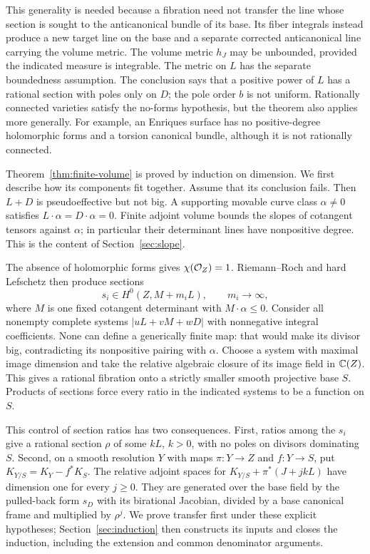 This generality is needed because a fibration need not transfer the
line whose section is sought to the anticanonical bundle of its base.
Its fiber integrals instead produce a new target line on the base and
a separate corrected anticanonical line carrying the volume metric.
The volume metric $h_J$ may be unbounded, provided the indicated
measure is integrable. The metric on $L$ has the separate boundedness
assumption. The conclusion says that a positive power of $L$
has a rational section with poles only on $D$; the pole order $b$ is not
uniform. Rationally connected varieties satisfy the no-forms hypothesis,
but the theorem also applies more generally. For example, an Enriques
surface has no positive-degree holomorphic forms and a torsion canonical
bundle, although it is not rationally connected.

Theorem~\ref{thm:finite-volume} is proved by induction on dimension.
We first describe how its components fit together.
Assume that its conclusion fails. Then $L+D$ is pseudoeffective but not
big. A supporting movable curve class $\alpha\ne0$ satisfies
$L\cdot\alpha=D\cdot\alpha=0$. Finite adjoint volume bounds the slopes
of cotangent tensors against $\alpha$; in particular their determinant
lines have nonpositive degree. This is the content of
Section~\ref{sec:slope}.

The absence of holomorphic forms gives $\chi(\mathcal O_Z)=1$. Riemann--Roch
and hard Lefschetz then produce sections
\[
 s_i\in H^0(Z,M+m_iL),\qquad m_i\longrightarrow\infty,
\]
where $M$ is one fixed cotangent determinant with $M\cdot\alpha\le0$.
Consider all nonempty complete systems $|uL+vM+wD|$ with nonnegative
integral coefficients. None can define a generically finite map: that
would make its divisor big, contradicting its nonpositive pairing with
$\alpha$. Choose a system with maximal image dimension and take the
relative algebraic closure of its image field in $\mathbb C(Z)$. This gives a
rational fibration onto a strictly smaller smooth projective base $S$.
Products of sections force every ratio in the indicated systems to be
a function on $S$.

This control of section ratios has two consequences. First, ratios among the
$s_i$ give a rational section $\rho$ of some $kL$, $k>0$, with no poles
on divisors dominating $S$. Second, on a smooth resolution $Y$ with maps $\pi:Y\to Z$ and
$f:Y\to S$, put $K_{Y/S}=K_Y-f^*K_S$. The relative adjoint spaces for
$K_{Y/S}+\pi^*(J+jkL)$ have dimension one for every $j\ge0$.
They are generated over the base field by the pulled-back form $s_D$
with its birational Jacobian,
divided by a base canonical frame and multiplied by $\rho^j$.
We prove transfer first under these explicit hypotheses;
Section~\ref{sec:induction} then constructs its inputs and closes the
induction, including the extension and common denominator arguments.

